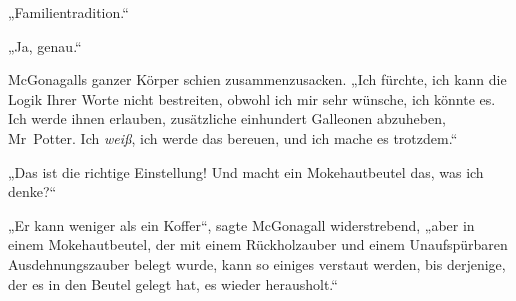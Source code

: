 „Familientradition.“

„Ja, genau.“

McGonagalls ganzer Körper schien zusammenzusacken.
„Ich fürchte, ich kann die Logik Ihrer Worte nicht bestreiten, obwohl ich mir sehr wünsche, ich könnte es. Ich werde ihnen erlauben, zusätzliche einhundert Galleonen abzuheben, Mr~Potter. Ich \emph{weiß}, ich werde das bereuen, und ich mache es trotzdem.“

„Das ist die richtige Einstellung! Und macht ein Mokehautbeutel das, was ich denke?“%

„Er kann weniger als ein Koffer“, sagte McGonagall widerstrebend, „aber in einem Mokehautbeutel, der mit einem Rückholzauber und einem Unaufspürbaren Ausdehnungszauber belegt wurde, kann so einiges verstaut werden, bis derjenige, der es in den Beutel gelegt hat, es wieder herausholt.“

